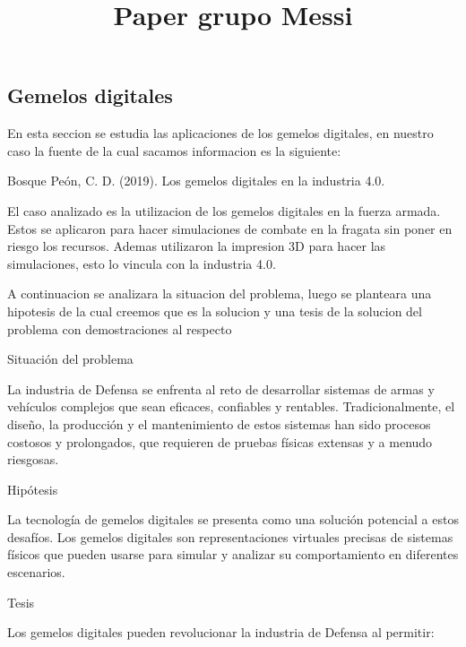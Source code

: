 \documentclass{article}
\title{Paper grupo Messi}
\author{
  }
\begin{document}
\maketitle


\begin{abstract}

\end{abstract}


\hypertarget{gemelos-digitales}{%
\subsection{Gemelos digitales}\label{gemelos-digitales}}

En esta seccion se estudia las aplicaciones de los gemelos digitales, en
nuestro caso la fuente de la cual sacamos informacion es la siguiente:

Bosque Peón, C. D. (2019). Los gemelos digitales en la industria 4.0.

El caso analizado es la utilizacion de los gemelos digitales en la
fuerza armada. Estos se aplicaron para hacer simulaciones de combate en
la fragata sin poner en riesgo los recursos. Ademas utilizaron la
impresion 3D para hacer las simulaciones, esto lo vincula con la
industria 4.0.

A continuacion se analizara la situacion del problema, luego se
planteara una hipotesis de la cual creemos que es la solucion y una
tesis de la solucion del problema con demostraciones al respecto

Situación del problema

La industria de Defensa se enfrenta al reto de desarrollar sistemas de
armas y vehículos complejos que sean eficaces, confiables y rentables.
Tradicionalmente, el diseño, la producción y el mantenimiento de estos
sistemas han sido procesos costosos y prolongados, que requieren de
pruebas físicas extensas y a menudo riesgosas.

Hipótesis

La tecnología de gemelos digitales se presenta como una solución
potencial a estos desafíos. Los gemelos digitales son representaciones
virtuales precisas de sistemas físicos que pueden usarse para simular y
analizar su comportamiento en diferentes escenarios.

Tesis

Los gemelos digitales pueden revolucionar la industria de Defensa al
permitir:
\end{document}
